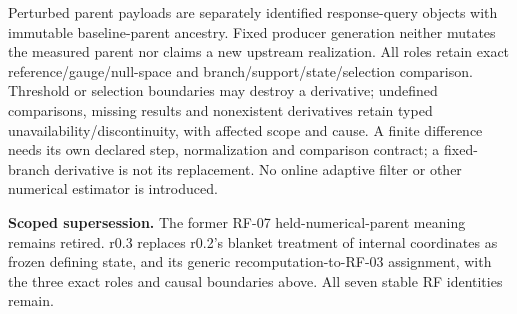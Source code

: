 {{Perturbed parent payloads are separately identified response-query objects
with immutable baseline-parent ancestry. Fixed producer generation neither
mutates the measured parent nor claims a new upstream realization. All roles
retain exact reference/gauge/null-space and branch/support/state/selection
comparison. Threshold or selection boundaries may destroy a derivative;
undefined comparisons, missing results and nonexistent derivatives retain
typed unavailability/discontinuity, with affected scope and cause. A finite
difference needs its own declared step, normalization and comparison contract;
a fixed-branch derivative is not its replacement. No online adaptive filter
or other numerical estimator is introduced.

\textbf{Scoped supersession.} The former RF-07 held-numerical-parent meaning
remains retired. r0.3 replaces r0.2's blanket treatment of internal coordinates as frozen
defining state, and its generic recomputation-to-RF-03 assignment, with the
three exact roles and causal boundaries above. All seven stable RF identities remain.
}}
